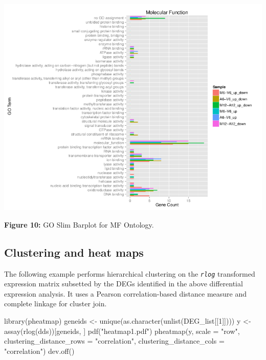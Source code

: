 \documentclass[14pt,]{article}
\newcommand{\hlnum}[1]{\textcolor[rgb]{0.816,0.125,0.439}{#1}}%
\newcommand{\hlstr}[1]{\textcolor[rgb]{0.251,0.627,0.251}{#1}}%
\newcommand{\hlstd}[1]{\textcolor[rgb]{0.251,0.251,0.251}{#1}}%
\newenvironment{Shaded}{\begin{myshaded}}{\end{myshaded}}
\newcommand{\DecValTok}[1]{\hlnum{#1}}
\newcommand{\StringTok}[1]{\hlstr{#1}}
\newcommand{\OtherTok}[1]{{#1}}
\newcommand{\FunctionTok}[1]{\hlstd{#1}}
\newcommand{\AttributeTok}[1]{{#1}}
\newcommand{\NormalTok}[1]{\hlstd{#1}}
\begin{document}
\includegraphics{GOslimbarplotMF.png}

\textbf{Figure 10:} GO Slim Barplot for MF Ontology.

\hypertarget{clustering-and-heat-maps}{%
\subsection{Clustering and heat maps}\label{clustering-and-heat-maps}}

The following example performs hierarchical clustering on the \emph{\texttt{rlog}} transformed expression matrix subsetted by the DEGs identified in the
above differential expression analysis. It uses a Pearson correlation-based distance measure and complete linkage for cluster join.

\begin{Shaded}
\begin{Highlighting}[]
\FunctionTok{library}\NormalTok{(pheatmap)}
\NormalTok{geneids }\OtherTok{\textless{}{-}} \FunctionTok{unique}\NormalTok{(}\FunctionTok{as.character}\NormalTok{(}\FunctionTok{unlist}\NormalTok{(DEG\_list[[}\DecValTok{1}\NormalTok{]])))}
\NormalTok{y }\OtherTok{\textless{}{-}} \FunctionTok{assay}\NormalTok{(}\FunctionTok{rlog}\NormalTok{(dds))[geneids, ]}
\FunctionTok{pdf}\NormalTok{(}\StringTok{"heatmap1.pdf"}\NormalTok{)}
\FunctionTok{pheatmap}\NormalTok{(y, }\AttributeTok{scale =} \StringTok{"row"}\NormalTok{, }\AttributeTok{clustering\_distance\_rows =} \StringTok{"correlation"}\NormalTok{, }\AttributeTok{clustering\_distance\_cols =} \StringTok{"correlation"}\NormalTok{)}
\FunctionTok{dev.off}\NormalTok{()}
\end{Highlighting}
\end{Shaded}
\end{document}
